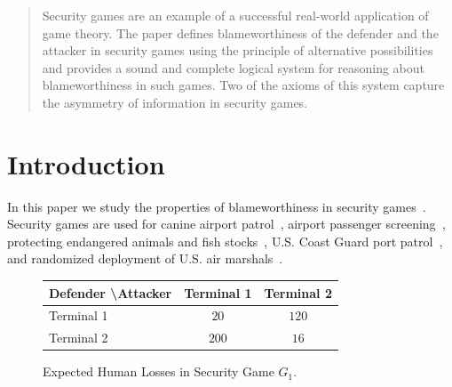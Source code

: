 \documentclass[letterpaper]{article}
\begin{document}
\maketitle

\begin{abstract}
Security games are an example of a successful real-world application of game theory. The paper defines blameworthiness of  the defender and the attacker in security games using the principle of alternative possibilities and provides a sound and complete logical system for reasoning about blameworthiness in such games. Two of the axioms of this system capture the asymmetry of information in security games.
\end{abstract}


\section{Introduction}

In this paper we study the properties of blameworthiness in security games~\cite{s34}. Security games are used for
canine airport patrol~\cite{pjmoptwpk08aamas,jtpkrto10interfaces},
airport passenger screening~\cite{bsst16aaai},
protecting endangered animals and fish stocks~\cite{fst15ijcai},
U.S. Coast Guard port patrol~\cite{sfakt18ijcai,ats16ihs},
and randomized deployment of U.S. air marshals~\cite{sfakt18ijcai}.


\begin{figure}[ht]
\begin{center}
\renewcommand{\arraystretch}{1.3}
\begin{tabular}{ l | c  c }
Defender \textbackslash Attacker  & Terminal 1 & Terminal 2  \\  \hline
 Terminal 1 & $20$ & $120$ \\
 Terminal 2 & $200$ & $16$
\end{tabular}
\caption{Expected Human Losses in Security Game $G_1$.}\label{losses figure}
\end{center}
\end{figure}
\end{document}
